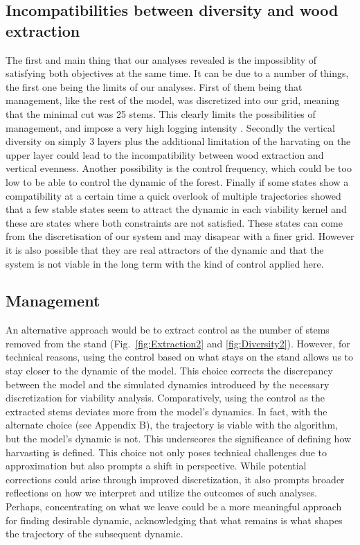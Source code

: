 \documentclass{article}
\begin{document}
\subsection{Incompatibilities between diversity and wood extraction}

The first and main thing that our analyses revealed is the impossiblity of satisfying both objectives at the same time. It can be due to a number of things, the first one being the limits of our analyses. First of them being that management, like the rest of the model, was discretized into our grid, meaning that the minimal cut was 25 stems. This clearly limits the possibilities of management, and impose a very high logging intensity \autocite{INVENTAIREFORESTIER}. Secondly the vertical diversity on simply 3 layers plus the additional limitation of the harvating on the upper layer could lead to the incompatibility between wood extraction and vertical evenness. Another possibility is the control frequency, which could be too low to be able to control the dynamic of the forest. Finally if some states show a compatibility at a certain time a quick overlook of multiple trajectories showed that a few stable states seem to attract the dynamic in each viability kernel and these are states where both constraints are not satisfied. These states can come from the discretisation of our system and may disapear with a finer grid. However it is also possible that they are real attractors of the dynamic and that the system is not viable in the long term with the kind of control applied here.

\subsection{Management}

An alternative approach would be to extract control as the number of stems removed from the stand (Fig.~\ref{fig:Extraction2} and \ref{fig:Diversity2}). However, for technical reasons, using the control based on what stays on the stand allows us to stay closer to the dynamic of the model. This choice corrects the discrepancy between the model and the simulated dynamics introduced by the necessary discretization for viability analysis. Comparatively, using the control as the extracted stems deviates more from the model's dynamics. In fact, with the alternate choice (see Appendix B), the trajectory is viable with the algorithm, but the model's dynamic is not. This underscores the significance of defining how harvasting is defined. This choice not only poses technical challenges due to approximation but also prompts a shift in perspective. While potential corrections could arise through improved discretization, it also prompts broader reflections on how we interpret and utilize the outcomes of such analyses. Perhaps, concentrating on what we leave could be a more meaningful approach for finding  desirable dynamic, acknowledging that what remains is what shapes the trajectory of the subsequent dynamic.
\end{document}

